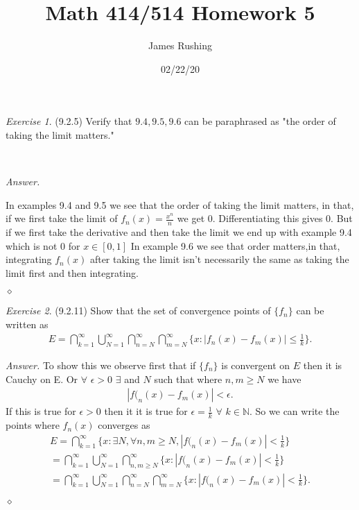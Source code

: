 \documentclass[12pt,oneside]{amsart}
\title{Math 414/514 Homework 5}
\author{James Rushing}
\date{02/22/20}
\theoremstyle{definition}
\theoremstyle{remark}
\newtheorem{exer}{Exercise}
\numberwithin{equation}{exer}
\newenvironment{answer}{\bigskip\noindent\emph{Answer.}}{\hfill$\diamond$\newline}
\begin{document}
\maketitle

\begin{exer} (9.2.5)
Verify that $9.4,9.5,9.6$ can be paraphrased as "the order of taking the limit matters."
\end{exer}



\




\begin{answer}

\indent In examples 9.4 and 9.5 we see that the order of taking the limit matters, in that, if we first take the limit of $f_n(x)=\frac{x^n}{n}$ we get 0. Differentiating this gives 0. But if we first take the derivative and then take the limit we end up with example 9.4 which is not 0 for $x \in [0,1]$
\newline \indent In example 9.6 we see that order matters,in that, integrating $f_n(x)$ after taking the limit isn't necessarily the same as taking the limit first and then integrating.

\end{answer}


\newpage
\indent \newline
\begin{exer} (9.2.11)
Show that the set of convergence points of $\{f_n\}$ can be written as 
\begin{align*}
    E= \bigcap_{k=1}^\infty \bigcup_{N=1}^\infty \bigcap_{n=N}^\infty \bigcap_{m=N}^\infty \{ x : |f_n(x)-f_m(x)|\leq \frac{1}{k}\}.
    \end{align*}
\end{exer}
\begin{answer}
    To show this we observe first that if $\{f_n\}$ is convergent on $E$ then it is Cauchy on E. Or $\forall$ $\epsilon > 0$ $\exists$ and $N$ such that where $n,m \geq N$ we have 
\begin{align*}
    |f(_n(x) - f_m(x)| < \epsilon.
\end{align*}
If this is true for $\epsilon > 0$ then it it is true for $\epsilon = \frac{1}{k}$ $\forall$ $k \in \mathbb{N}$. So we can write the points where $f_n(x)$ converges as
\begin{align*}
    E 
    =\bigcap_{k=1}^\infty \{x: \exists N, \forall n,m\geq N,|f(_n(x) - f_m(x)| < \frac{1}{k} \}\\
    =\bigcap_{k=1}^\infty \bigcup_{N=1}^\infty \bigcap_{n,m\geq N}^\infty\{x: |f(_n(x) - f_m(x)| < \frac{1}{k} \}\\
    =\bigcap_{k=1}^\infty \bigcup_{N=1}^\infty \bigcap_{n=N}^\infty \bigcap_{m=N}^\infty\{x: |f(_n(x) - f_m(x)| < \frac{1}{k} \}.
\end{align*}

\end{answer}
\end{document}
